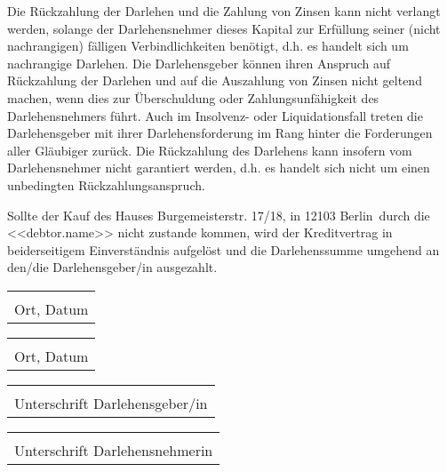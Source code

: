 \documentclass[]{scrartcl}
\newcommand{\addressStreet}{Burgemeisterstr. 17/18}
\newcommand{\addressWithZIP}{\addressStreet, in 12103 Berlin}
\begin{document}
\begin{contract}
Die Rückzahlung der Darlehen und die Zahlung von Zinsen kann nicht verlangt werden, solange der Darlehensnehmer dieses Kapital zur Erfüllung seiner (nicht nachrangigen) fälligen Verbindlichkeiten benötigt, d.h. es handelt sich um nachrangige Darlehen. Die Darlehensgeber können ihren Anspruch auf Rückzahlung der Darlehen und auf die Auszahlung von Zinsen nicht geltend machen, wenn dies zur Überschuldung oder Zahlungsunfähigkeit des Darlehensnehmers führt. Auch im Insolvenz- oder Liquidationsfall treten die Darlehensgeber mit ihrer Darlehensforderung im Rang hinter die Forderungen aller Gläubiger zurück. Die Rückzahlung des Darlehens kann insofern vom Darlehensnehmer nicht garantiert werden, d.h. es handelt sich nicht um einen unbedingten Rückzahlungsanspruch.

Sollte der Kauf des Hauses \addressWithZIP\ durch die <<debtor.name>> nicht zustande kommen, wird der Kreditvertrag in beiderseitigem Einverständnis aufgelöst und die Darlehenssumme umgehend an den/die Darlehensgeber/in ausgezahlt.

\end{contract}

\vspace{1,5 cm}
\begin{tabular}{p{6cm}}
\dotfill \\
Ort, Datum
\end{tabular}%
\hfill
\begin{tabular}{p{6cm}}
\dotfill \\
Ort, Datum
\end{tabular}%

\vspace{1,5 cm}
\begin{tabular}{p{6cm}}
\dotfill \\
Unterschrift Darlehensgeber/in
\end{tabular}%
\hfill
\begin{tabular}{p{6cm}}
\dotfill \\
Unterschrift Darlehensnehmerin
\end{tabular}%
\end{document}
